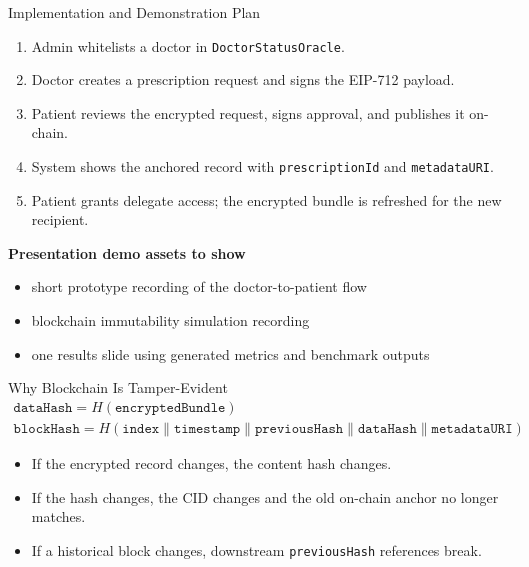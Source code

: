\documentclass[10pt]{beamer}
\begin{document}
\begin{frame}{Implementation and Demonstration Plan}
\small
\begin{enumerate}
  \item Admin whitelists a doctor in \texttt{DoctorStatusOracle}.
  \item Doctor creates a prescription request and signs the EIP-712 payload.
  \item Patient reviews the encrypted request, signs approval, and publishes it on-chain.
  \item System shows the anchored record with \texttt{prescriptionId} and \texttt{metadataURI}.
  \item Patient grants delegate access; the encrypted bundle is refreshed for the new recipient.
\end{enumerate}

\vspace{0.2cm}
\textbf{Presentation demo assets to show}
\begin{itemize}
  \item short prototype recording of the doctor-to-patient flow
  \item blockchain immutability simulation recording
  \item one results slide using generated metrics and benchmark outputs
\end{itemize}
\end{frame}


\begin{frame}{Why Blockchain Is Tamper-Evident}
\footnotesize
\begin{gather*}
\mathtt{dataHash} = H(\mathtt{encryptedBundle}) \\
\mathtt{blockHash} = H(\mathtt{index} \| \mathtt{timestamp} \| \mathtt{previousHash} \| \mathtt{dataHash} \| \mathtt{metadataURI})
\end{gather*}

\begin{center}
\end{center}

\vspace{-0.2cm}
\begin{itemize}
  \setlength{\itemsep}{0pt}
  \item If the encrypted record changes, the content hash changes.
  \item If the hash changes, the CID changes and the old on-chain anchor no longer matches.
  \item If a historical block changes, downstream \texttt{previousHash} references break.
\end{itemize}
\end{frame}
\end{document}
